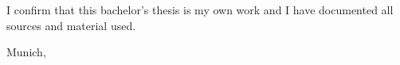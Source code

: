 %
\thispagestyle{empty}

\vspace*{0.8\textheight}
\noindent
I confirm that this bachelor's thesis is my own work and I have documented all sources and material used.

\vspace{15mm}
\noindent
Munich, \thesisDate {} \thesisAuthor
\newpage


